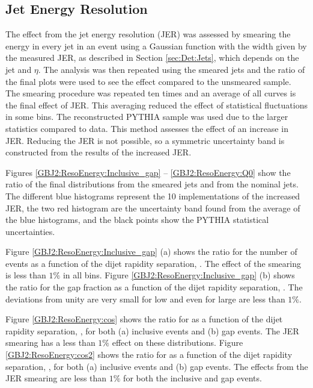 \subsection{Jet Energy Resolution}
\label{GBJ2:JER}

The effect from the jet energy resolution (JER) was assessed by smearing the energy in every jet in an event using a Gaussian function with the width given by the measured JER, as described in Section \ref{sec:Det:Jets}, which depends on the jet \pt{} and $\eta$. 
The analysis was then repeated using the smeared jets and the ratio of the final plots were used to see the effect compared to the unsmeared sample.
The smearing procedure was repeated ten times and an average of all curves is the final effect of JER.
This averaging reduced the effect of statistical fluctuations in some bins.
The reconstructed PYTHIA sample was used due to the larger statistics compared to data.
This method assesses the effect of an increase in JER. 
Reducing the JER is not possible, so a symmetric uncertainty band is constructed from the results of the increased JER.

Figures \ref{GBJ2:ResoEnergy:Inclusive_gap} -- \ref{GBJ2:ResoEnergy:Q0} show the ratio of the final distributions from the smeared jets and from the nominal jets.
The different blue histograms represent the 10 implementations of the increased JER, the two red histogram are the uncertainty band found from the average of the blue histograms, and the black points show the PYTHIA statistical uncertainties.  

Figure \ref{GBJ2:ResoEnergy:Inclusive_gap} (a) shows the ratio for the number of events as a function of the dijet rapidity separation, \dy{}.
The effect of the smearing is less than  $1\%$ in all bins.
Figure \ref{GBJ2:ResoEnergy:Inclusive_gap} (b) shows the ratio for the gap fraction as a function of the dijet rapidity separation, \dy{}.
The deviations from unity are very small for low \dy{} and even for large \dy{} are less than  $1\%$.


Figure \ref{GBJ2:ResoEnergy:cos} shows the ratio for \mean{\cosdphi{}} as a function of the dijet rapidity separation, \dy{}, for both (a) inclusive events and (b) gap events.
The JER smearing has a less than  $1\%$ effect on these distributions.
Figure \ref{GBJ2:ResoEnergy:cos2} shows the ratio for \mean{\costwodphi{}} as a function of the dijet rapidity separation, \dy{}, for both (a) inclusive events and (b) gap events.
The effects from the JER smearing are less than  $1\%$ for both the inclusive and gap events.

